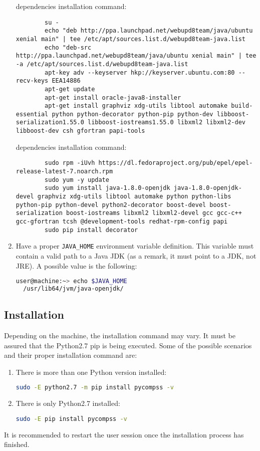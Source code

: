 \begin{enumerate}
    dependencies installation command:
     \begin{lstlisting}
        su -
        echo "deb http://ppa.launchpad.net/webupd8team/java/ubuntu xenial main" | tee /etc/apt/sources.list.d/webupd8team-java.list
        echo "deb-src http://ppa.launchpad.net/webupd8team/java/ubuntu xenial main" | tee -a /etc/apt/sources.list.d/webupd8team-java.list
        apt-key adv --keyserver hkp://keyserver.ubuntu.com:80 --recv-keys EEA14886
        apt-get update
        apt-get install oracle-java8-installer
        apt-get install graphviz xdg-utils libtool automake build-essential python python-decorator python-pip python-dev libboost-serialization1.55.0 libboost-iostreams1.55.0 libxml2 libxml2-dev libboost-dev csh gfortran papi-tools
     \end{lstlisting}
    dependencies installation command:
     \begin{lstlisting}
        sudo rpm -iUvh https://dl.fedoraproject.org/pub/epel/epel-release-latest-7.noarch.rpm
        sudo yum -y update
        sudo yum install java-1.8.0-openjdk java-1.8.0-openjdk-devel graphviz xdg-utils libtool automake python python-libs python-pip python-devel python2-decorator boost-devel boost-serialization boost-iostreams libxml2 libxml2-devel gcc gcc-c++ gcc-gfortran tcsh @development-tools redhat-rpm-config papi
        sudo pip install decorator
     \end{lstlisting}
 \item Have a proper \verb|JAVA_HOME| environment variable definition. This variable must contain a valid path to a Java JDK (as a remark, it must point to a JDK, not JRE). A possible value is the following:
 \begin{lstlisting}[language=bash]
  user@machine:~> echo $JAVA_HOME
  /usr/lib64/jvm/java-openjdk/\end{lstlisting}
\end{enumerate}


\subsection{Installation}
\label{subsec:pip_installation}
Depending on the machine, the installation command may vary. It must be assured that the Python2.7 pip is being executed. Some of the possible scenarios and their proper installation command are:
\begin{enumerate}
 \item There is more than one Python version installed:
 \begin{lstlisting}[language=bash]
 sudo -E python2.7 -m pip install pycompss -v\end{lstlisting}
 \item There is only Python2.7 installed:
 \begin{lstlisting}[language=bash]
 sudo -E pip install pycompss -v \end{lstlisting}
\end{enumerate}
It is recommended to restart the user session once the installation process has finished.

